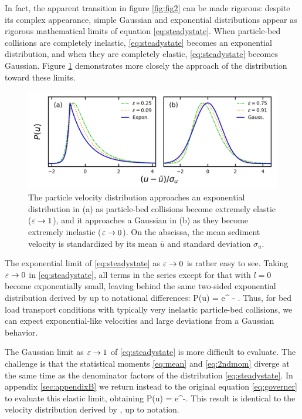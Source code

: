 In fact, the apparent transition in figure \ref{fig:fig2} can be made rigorous: despite its complex appearance, simple Gaussian and exponential distributions appear as rigorous mathematical limits of equation \ref{eq:steadystate}. When particle-bed collisions are completely inelastic, \ref{eq:steadystate} becomes an exponential distribution, and when they are completely elastic, \ref{eq:steadystate} becomes Gaussian. Figure \ref{fig:fig3} demonstrates more closely the approach of the distribution toward these limits.
\begin{figure}
	\centerline{\includegraphics{./figures/ch5/Fig3asymptotic.png}}
	\caption{The particle velocity distribution approaches an exponential distribution in (a) as particle-bed collisions become extremely elastic ($\varepsilon \rightarrow 1$), and it approaches a Gaussian in (b) as they become extremely inelastic ($\varepsilon \rightarrow 0$). On the abscissa, the mean sediment velocity is standardized by its mean $\bar{u}$ and standard deviation $\sigma_u$. }
	\label{fig:fig3}
\end{figure}

The exponential limit of \ref{eq:steadystate} as $\varepsilon \rightarrow 0$ is rather easy to see. Taking $\varepsilon \rightarrow 0 $ in \ref{eq:steadystate}, all terms in the series except for that with $l=0$ become exponentially small, leaving behind the same two-sided exponential distribution derived by \cite{Fan2014} up to notational differences:
\be P(u) = e^{ - }. \ee
Thus, for bed load transport conditions with typically very inelastic particle-bed collisions, we can expect exponential-like velocities and large deviations from a Gaussian behavior.

The Gaussian limit as $\varepsilon \rightarrow 1$ of \ref{eq:steadystate} is more difficult to evaluate. The challenge is that the statistical moments \ref{eq:mean} and \ref{eq:2ndmom} diverge at the same time as the denominator factors of the distribution \ref{eq:steadystate}. In appendix \ref{sec:appendixB} we return instead to the original equation \ref{eq:governer} to evaluate this elastic limit, obtaining
\be P(u) = e^{-}. \label{eq:gaussian}\ee
This result is identical to the velocity distribution derived by \citet{Ancey2014}, up to notation.

